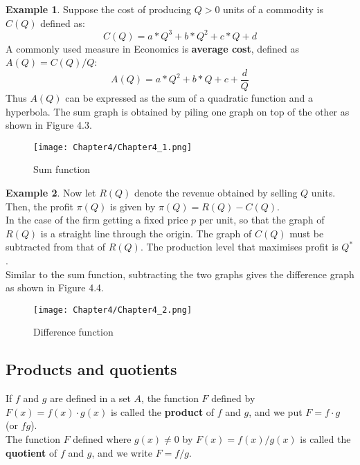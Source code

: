 \documentclass[10pt,a4paper]{book}
\theoremstyle{definition}\newtheorem{definition}{Definition}
\theoremstyle{definition}\newtheorem{fact}{Fact}
\theoremstyle{definition}\newtheorem{ex}{Ex.}
\theoremstyle{definition}\newtheorem{project}{Project}
\theoremstyle{definition}\newtheorem{problem}{Problem}
\theoremstyle{definition}\newtheorem{example}{Example}
\numberwithin{theorem}{chapter}
\numberwithin{corollary}{chapter}
\numberwithin{assumption}{chapter}
\numberwithin{definition}{chapter}
\numberwithin{prop}{chapter}
\numberwithin{notation}{chapter}
\numberwithin{problem}{chapter}
\numberwithin{example}{chapter}
\numberwithin{fact}{chapter}
\numberwithin{ex}{chapter}
\begin{document}
	\begin{example}
		Suppose the cost of producing $Q>0$ units of a commodity is $C(Q)$ defined as:
		$$C(Q) = a*Q^3 + b*Q^2 + c*Q + d$$
		A commonly used measure in Economics is \textbf{average cost}, defined as $A(Q)=C(Q)/Q$:
		$$A(Q) = a*Q^2 + b*Q + c + \frac{d}{Q}$$
		Thus $A(Q)$ can be expressed as the sum of a quadratic function and a hyperbola. The sum graph is obtained by piling one graph on top of the other as shown in Figure 4.3.
		\begin{figure}[ht]
			\centering
			\texttt{[image: Chapter4/Chapter4\_1.png]}
			\caption{Sum function}
		\end{figure}
	\end{example}
	
	\begin{example}
		Now let $R(Q)$ denote the revenue obtained by selling $Q$ units. Then, the profit $\pi(Q)$ is given by $\pi(Q) = R(Q) - C(Q)$.
		\\
		In the case of the firm getting a fixed price $p$ per unit, so that the graph of $R(Q)$ is a straight line through the origin. The graph of $C(Q)$ must be subtracted from that of $R(Q)$. The production level that maximises profit is $Q^*$.
		\\
		Similar to the sum function, subtracting the two graphs gives the difference graph as shown in Figure 4.4.
		\begin{figure}[ht]
			\centering
			\texttt{[image: Chapter4/Chapter4\_2.png]}
			\caption{Difference function}
		\end{figure}
	\end{example}
	
	\subsection{Products and quotients}
	If $f$ and $g$ are defined in a set $A$, the function $F$ defined by $F(x) = f(x) \cdot g(x)$ is called the \textbf{product} of $f$ and $g$, and we put $F=f \cdot g$ (or $fg$).
	\\
	The function $F$ defined where $g(x) \neq 0$ by $F(x) = f(x)/g(x) $ is called the \textbf{quotient} of $f$ and $g$, and we write $F = f/g$.
	
\end{document}
